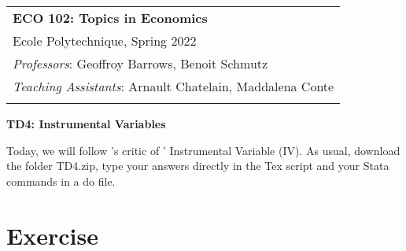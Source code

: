 \documentclass[11pt, a4paper]{article} %
\begin{document}
\begin{tabular}{p{14.5cm}}
	{\large \textbf{ECO 102: Topics in Economics}} \\
	Ecole Polytechnique, Spring 2022  \\
	\textit{Professors}: Geoffroy Barrows, Benoit Schmutz \\
	\textit{Teaching Assistants}: Arnault Chatelain, Maddalena Conte \\
	\hline
	\\
\end{tabular}

\begin{center}
	{\Large \textbf{TD4: Instrumental Variables}}
	\vspace{2mm}
	
\end{center} 

\vspace{0.4cm}

Today, we will follow \citet{albouy2012colonial}'s critic of \citet{acemoglu2001colonial}' Instrumental Variable (IV). As usual, download the folder TD4.zip, type your answers directly in the Tex script and your Stata commands in a do file.


\section*{Exercise}
\end{document}
